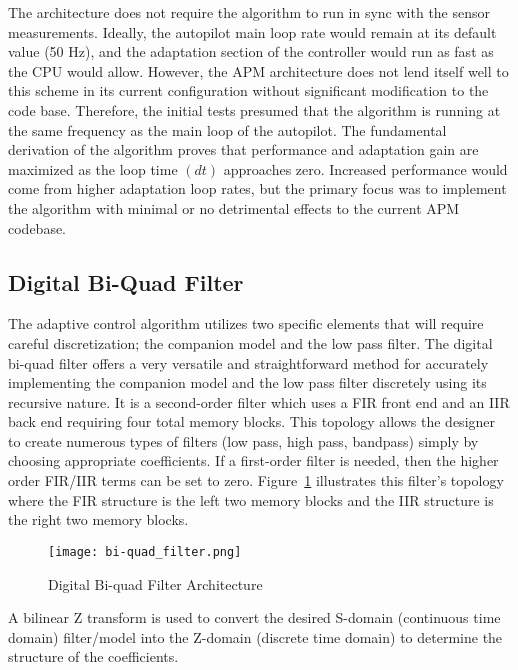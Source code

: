The \Lone architecture does not require the algorithm to run in sync with the sensor measurements.  Ideally, the autopilot main loop rate would remain at its default value (50 Hz), and the adaptation section of the \Lone controller would run as fast as the CPU would allow.  However, the \ac{APM} architecture does not lend itself well to this scheme in its current configuration without significant modification to the code base.  Therefore, the initial tests presumed that the \Lone algorithm is running at the same frequency as the main loop of the autopilot.  The fundamental derivation of the \Lone algorithm proves that performance and adaptation gain are maximized as the loop time $(dt)$ approaches zero.  Increased performance would come from higher adaptation loop rates, but the primary focus was to implement the \Lone algorithm with minimal or no detrimental effects to the current \ac{APM} codebase.

\subsection{Digital Bi-Quad Filter}

The \Lone adaptive control algorithm utilizes two specific elements that will require careful discretization; the companion model and the low pass filter.  The digital bi-quad filter offers a very versatile and straightforward method for accurately implementing the companion model and the low pass filter discretely using its recursive nature.  It is a second-order filter which uses a \ac{FIR} front end and an \ac{IIR} back end requiring four total memory blocks.  This topology allows the designer to create numerous types of filters (low pass, high pass, bandpass) simply by choosing appropriate coefficients.  If a first-order filter is needed, then the higher order FIR/IIR terms can be set to zero.  Figure~\ref{fig:bi-quad} illustrates this filter's topology where the \ac{FIR} structure is the left two memory blocks and the \ac{IIR} structure is the right two memory blocks.

\begin{figure}[h!]
 \centering
  \texttt{[image: bi-quad\_filter.png]}
  \caption{Digital Bi-quad Filter Architecture }
  \label{fig:bi-quad}
\end{figure}

A bilinear Z transform is used to convert the desired S-domain (continuous time domain) filter/model into the Z-domain (discrete time domain) to determine the structure of the coefficients.

